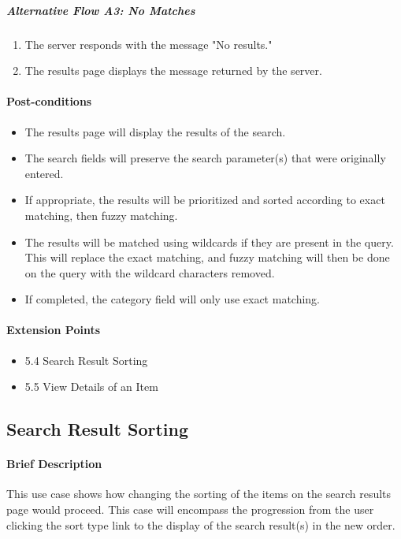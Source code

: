 \documentclass{article}
\begin{document}
\subparagraph{Alternative Flow A3: No Matches}
\begin{enumerate}
\item The server responds with the message "No results."
\item The results page displays the message returned by the server.
\end{enumerate}

\paragraph{Post-conditions}
\begin{itemize}
\item The results page will display the results of the search.
\item The search fields will preserve the search parameter(s) that were originally entered.
\item If appropriate, the results will be prioritized and sorted according to exact matching, then fuzzy matching.
\item The results will be matched using wildcards if they are present in the query.  This will replace the exact matching, and fuzzy matching will then be done on the query with the wildcard characters removed.
\item If completed, the category field will only use exact matching.
\end{itemize}

\paragraph{Extension Points}
\begin{itemize}
\item 5.4 Search Result Sorting
\item 5.5 View Details of an Item
\end{itemize}


\subsection{Search Result Sorting}

\paragraph{Brief Description}
This use case shows how changing the sorting of the items on the search results page would proceed. This case will encompass the progression from the user clicking the sort type link to the display of the search result(s) in the new order.
\end{document}
